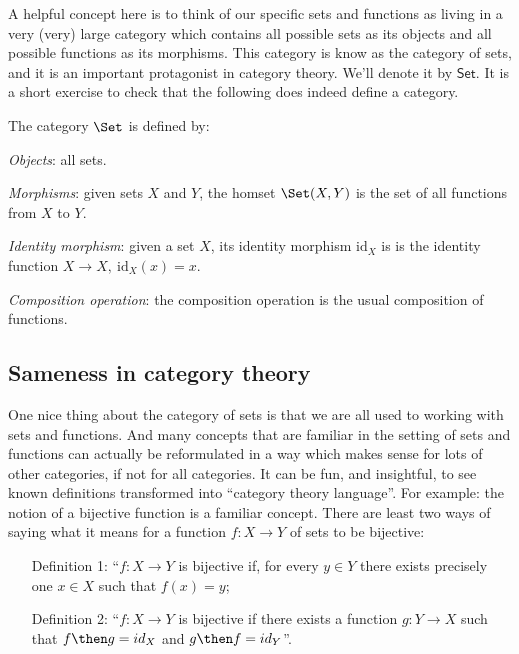 A helpful concept here is to think of our specific sets and functions as living in a very (very) large category which contains all possible sets as its objects and all possible functions as its morphisms. This category is know as the category of sets, and it is an important protagonist in category theory. We'll denote it by $\mathsf{Set}$. It is a short exercise to check that the following does indeed define a category. 

\begin{shaded}
\begin{definition}
    The category $\Set$ is defined by:
    \begin{compactenum}
    \item \emph{Objects}: all sets.
    \item \emph{Morphisms}: given sets $X$ and  $Y$, the homset $\Set(X,Y)$ is the set of all functions from $X$ to $Y$.
    \item \emph{Identity morphism}: given a set $X$, its identity morphism $\text{id}_X$ is
    is the identity function $X \rightarrow X, \ \text{id}_X(x) = x$.
    \item \emph{Composition operation}: the composition operation is the usual composition of functions.
    \end{compactenum}
\end{definition}
\end{shaded}


\subsection{Sameness in category theory}

One nice thing about the category of sets is that we are all used to working with sets and functions. And many concepts that are familiar in the setting of sets and functions can actually be reformulated in a way which makes sense for lots of other categories, if not for all categories. It can be fun, and insightful, to see known definitions transformed into ``category theory language''. For example: the notion of a bijective function is a familiar concept. There are least two ways of saying what it means for a function $f : X \rightarrow Y$ of sets to be bijective:
\begin{itemize}
\item[Definition 1:] ``$f:X \rightarrow Y$ is bijective if, for every $y \in Y$ there exists precisely one $x \in X$ such that $f(x) = y$;
\item[Definition 2:] ``$f: X \rightarrow Y$ is bijective if there exists a function $g: Y \rightarrow X$ such that $f \then g = id_X$ and $g \then f = id_Y$''. 
\end{itemize}

